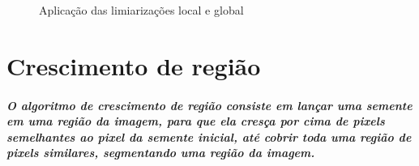 \documentclass[12pt,fleqn]{article}
\begin{document}
  \begin{figure}[!htb]
  \centering
  \caption{Aplicação das limiarizações local e global}
  \label{fig:Resultado 1}
  \end{figure}

  \section{Crescimento de região}

      \subparagraph{\normalfont O algoritmo de crescimento de região consiste em lançar uma semente em uma região da imagem, para que ela cresça por cima de pixels semelhantes ao pixel da semente inicial, até cobrir toda uma região de pixels similares, segmentando uma região da imagem.}
      
\end{document}
